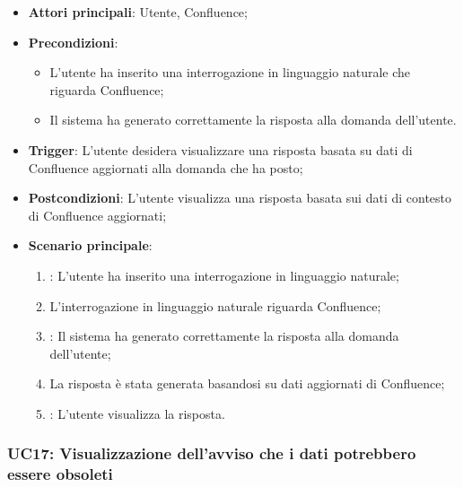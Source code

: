 \begin{itemize}
    \item \textbf{Attori principali}: Utente, Confluence;
    \item \textbf{Precondizioni}: 
    \begin{itemize}
        \item L'utente ha inserito una interrogazione in linguaggio naturale che riguarda Confluence;
        \item Il sistema ha generato correttamente la risposta alla domanda dell'utente.
    \end{itemize}
    \item \textbf{Trigger}: L'utente desidera visualizzare una risposta basata su dati di Confluence aggiornati alla domanda che ha posto;
    \item \textbf{Postcondizioni}: L'utente visualizza una risposta basata sui dati di contesto di Confluence aggiornati;
    \item \textbf{Scenario principale}: 
    \begin{enumerate}
        \item {}: L'utente ha inserito una interrogazione in linguaggio naturale;
        \item L'interrogazione in linguaggio naturale riguarda Confluence;
        \item {}: Il sistema ha generato correttamente la risposta alla domanda dell'utente;
        \item La risposta è stata generata basandosi su dati aggiornati di Confluence;
        \item {}: L'utente visualizza la risposta.
    \end{enumerate}
\end{itemize}



\hypertarget{UC17}{}
\subsubsection{UC17: Visualizzazione dell’avviso che i dati potrebbero essere obsoleti}

